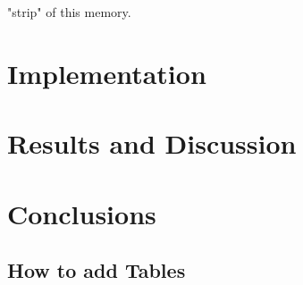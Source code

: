 \documentclass{report}
\begin{document}
"strip" of this memory. 



\section{Implementation}

\section{Results and Discussion}

\section{Conclusions}

\subsection{How to add Tables}
\end{document}
